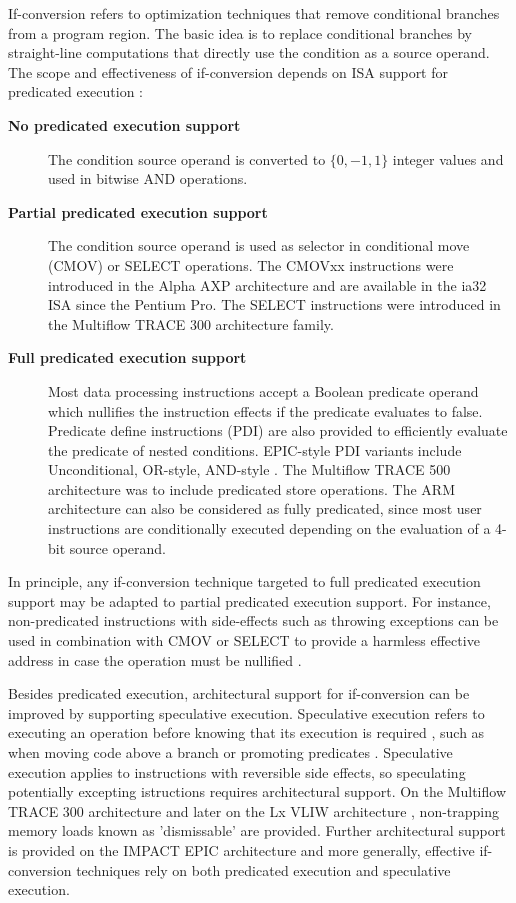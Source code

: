 If-conversion refers to optimization techniques that remove conditional branches
from a program region. The basic idea is to replace conditional branches by
straight-line computations that directly use the condition as a source operand.
The scope and effectiveness of if-conversion depends on ISA support for predicated
execution \cite{Mahlke:1995:ISCA}: \begin{description}
\item[\bf No predicated execution support] The condition source operand is converted
to $\{0, -1, 1\}$ integer values and used in bitwise AND operations.
\item[\bf Partial predicated execution support] The condition source operand is used
as selector in conditional move (CMOV) or SELECT operations. The CMOVxx
instructions were introduced in the Alpha AXP architecture
\cite{Blickstein:1992:DTJ} and are available in the ia32 ISA since the Pentium Pro.
The SELECT instructions were introduced in the Multiflow TRACE 300 architecture
family.
\item[\bf Full predicated execution support] Most data processing instructions
accept a Boolean predicate operand which nullifies the instruction effects if the
predicate evaluates to false. Predicate define instructions (PDI) are also
provided to efficiently evaluate the predicate of nested conditions. EPIC-style PDI
variants include Unconditional, OR-style, AND-style \cite{Mahlke:1995:ISCA}.
The Multiflow TRACE 500 architecture was to include predicated store operations.
The ARM architecture can also be considered as fully predicated, since most user
instructions are conditionally executed depending on the evaluation of a 4-bit
source operand.
\end{description} In principle, any if-conversion technique targeted to full
predicated execution support may be adapted to partial predicated execution
support. For instance, non-predicated instructions with side-effects such as
throwing exceptions can be used in combination with CMOV or SELECT to provide a
harmless effective address in case the operation must be nullified
\cite{Mahlke:1995:ISCA}.

Besides predicated execution, architectural support for if-conversion can be
improved by supporting speculative execution. Speculative execution refers to
executing an operation before knowing that its execution is required
\cite{Mahlke:1992:ASPLOS}, such as when moving code above a branch
\cite{Lowney:1992:JS} or promoting predicates \cite{Mahlke:1995:ISCA}.
Speculative execution applies to instructions with reversible side effects, so
speculating potentially excepting istructions requires architectural support. On
the Multiflow TRACE 300 architecture and later on the Lx VLIW architecture
\cite{Faraboschi:2000:ISCA}, non-trapping memory loads known as 'dismissable'
are provided. Further architectural support is provided on the IMPACT EPIC
architecture \cite{August:1998:ISCA} and more generally, effective if-conversion
techniques rely on both predicated execution and speculative execution.

